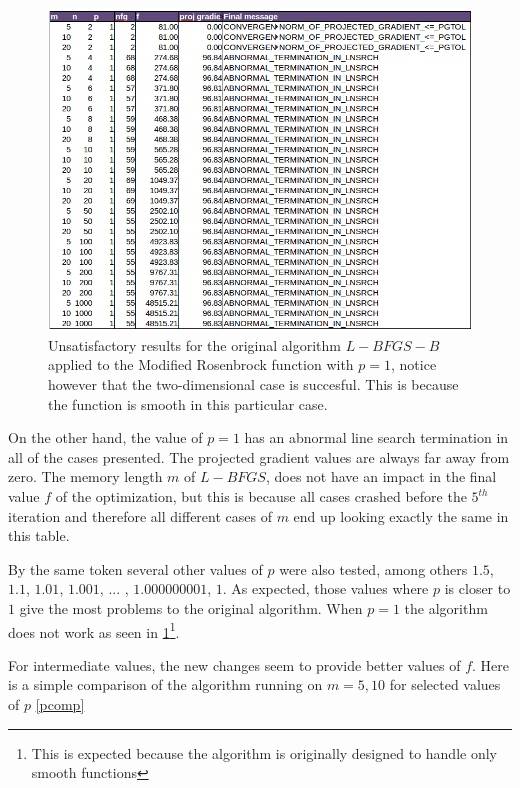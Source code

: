 \begin{figure}
\begin{center}
\includegraphics[scale=0.5]{Figures/abnormalNocedal.png}
\caption[Modified Rosenbrock with $p = 1$]{Unsatisfactory results for the original algorithm $L-BFGS-B$ applied to the Modified Rosenbrock function with $p = 1$, notice however that the two-dimensional case is succesful.  This is because the function is smooth in this particular case.}
\label{pequal1}
\end{center}
\end{figure}

On the other hand, the value of $p = 1$ has an abnormal line search termination in all of the cases presented. The projected gradient values are always far away from zero. The memory length $m$ of $L-BFGS$, does not have an impact in the final value $f$ of the optimization, but this is because all cases crashed before the $5^{th}$ iteration and therefore all different cases of $m$ end up looking exactly the same in this table.

By the same token several other values of $p$ were also tested, among others $1.5$, $1.1$, $1.01$, $1.001$, ... , $1.000000001$, $1$. As expected, those values where $p$ is closer to $1$ give the most problems to the original algorithm. When $p=1$ the algorithm does not work as seen in \ref{pequal1}\footnote{This is expected because the algorithm is originally designed to handle only smooth functions}.

For intermediate values, the new changes seem to provide better values of $f$. Here is a simple comparison of the algorithm running on $m = 5,10$ for selected values of $p$ \ref{pcomp}

